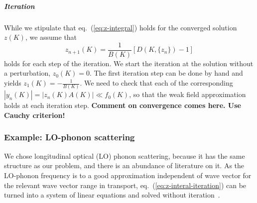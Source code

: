\documentclass[physics,phd,nolot,nolof]{uccthesis}%
\newcommand{\alert}[1]{\textbf{\color{red}#1}}
\begin{document}
{%
\subparagraph*{Iteration}
While we stipulate that eq.~(\ref{eq:z-integral}) holds for the converged
solution $z(K)$, we assume that 
\begin{equation}
  z_{n+1}(K)= \frac{1}{B(K)}\left[ D(K,\{z_n\}) -1\right]
  \label{eq:z-interal-iteration}
\end{equation}
holds for each step of the iteration.
We start the iteration at the solution without a perturbation,
$z_0(K) =0$.
The first iteration step can be done by hand and yields
$z_1(K)=-\frac{1}{B(K)}$.
We need to check that each of the corresponding 
$|y_n(K)| = |z_n(K) A(K)| \ll f_0(K)$, 
so that the weak field approximation holds at each iteration step.
\alert{Comment on convergence comes here. Use Cauchy criterion!}


\subsubsection{Example: LO-phonon scattering}
\label{sec:LOphonon}
We chose longitudinal optical (LO) phonon scattering, because it has the 
same structure as our problem, and there is an abundance of literature
on it. 
As the LO-phonon frequency is to a good approximation independent
of wave vector for the relevant wave vector range in transport, 
eq.~(\ref{eq:z-interal-iteration}) can be turned into a system of 
linear equations and solved without iteration~\cite{Delves1959,Fletcher-Butcher,Ridleyladdermethod}.

}
\end{document}

